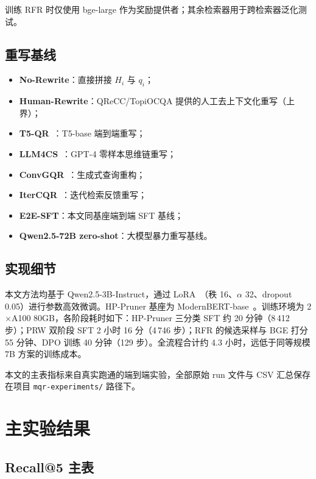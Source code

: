 训练 RFR 时仅使用 bge-large 作为奖励提供者；其余检索器用于跨检索器泛化测试。

\subsection{重写基线}

\begin{itemize}
    \item \textbf{No-Rewrite}：直接拼接 $H_i$ 与 $q_i$；
    \item \textbf{Human-Rewrite}：QReCC/TopiOCQA 提供的人工去上下文化重写（上界）；
    \item \textbf{T5-QR}~\citep{lin2020conversational}：T5-base 端到端重写；
    \item \textbf{LLM4CS}~\citep{mao2023llm4cs}：GPT-4 零样本思维链重写；
    \item \textbf{ConvGQR}~\citep{mo2023convgqr}：生成式查询重构；
    \item \textbf{IterCQR}~\citep{jang2024itercqr}：迭代检索反馈重写；
    \item \textbf{E2E-SFT}：本文同基座端到端 SFT 基线；
    \item \textbf{Qwen2.5-72B zero-shot}：大模型暴力重写基线。
\end{itemize}

\subsection{实现细节}

本文方法均基于 Qwen2.5-3B-Instruct，通过 LoRA~\citep{lora2022}（秩 16、$\alpha$ 32、dropout 0.05）进行参数高效微调。HP-Pruner 基座为 ModernBERT-base~\citep{warner2024modernbert}。训练环境为 2$\times$A100 80GB，各阶段耗时如下：HP-Pruner 三分类 SFT 约 20 分钟（8\,412 步）；PRW 双阶段 SFT 2 小时 16 分（4\,746 步）；RFR 的候选采样与 BGE 打分 55 分钟、DPO 训练 40 分钟（129 步）。全流程合计约 4.3 小时，远低于同等规模 7B 方案的训练成本。

本文的主表指标来自真实跑通的端到端实验，全部原始 run 文件与 CSV 汇总保存在项目 \texttt{mqr-experiments/} 路径下。

\section{主实验结果}
\label{sec:exp_main}

\subsection{Recall@5 主表}


